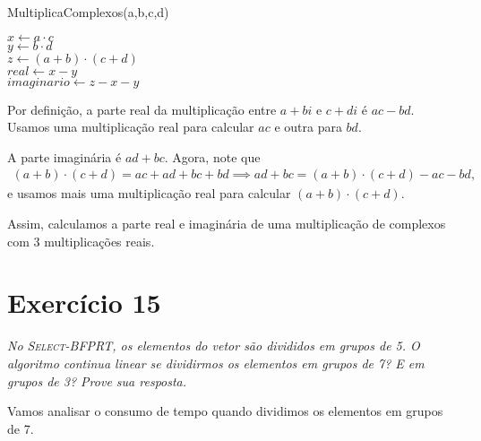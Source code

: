 \documentclass{article}
\begin{document}
\bigskip

\begin{algorithm}
  \caption{MultiplicaComplexos(a,b,c,d)}
  $x \gets a \cdot c$ \\
  $y \gets b \cdot d$ \\
  $z \gets (a + b) \cdot (c + d)$ \\
  $real \gets x - y$ \\
  $imaginario \gets z - x - y$ \\
\end{algorithm}

Por definição, a parte real da multiplicação entre $a + bi$ e $c + di$ é $ac - bd$. Usamos uma multiplicação real para calcular $ac$ e outra para $bd$.

A parte imaginária é $ad + bc$. Agora, note que
\begin{align*}
  (a+b) \cdot (c+d) = ac + ad + bc + bd \implies ad + bc = (a+b) \cdot (c+d) - ac - bd ,
\end{align*}
e usamos mais uma multiplicação real para calcular $(a+b) \cdot (c+d)$.

Assim, calculamos a parte real e imaginária de uma multiplicação de complexos com 3 multiplicações reais.

\newpage

\section*{Exercício 15}
\textit{No \textsc{Select-BFPRT}, os elementos do vetor são divididos em grupos de 5. O algoritmo continua linear se dividirmos os elementos em grupos de 7? E em grupos de 3? Prove sua resposta.}

\bigskip

Vamos analisar o consumo de tempo quando dividimos os elementos em grupos de 7.
\end{document}

